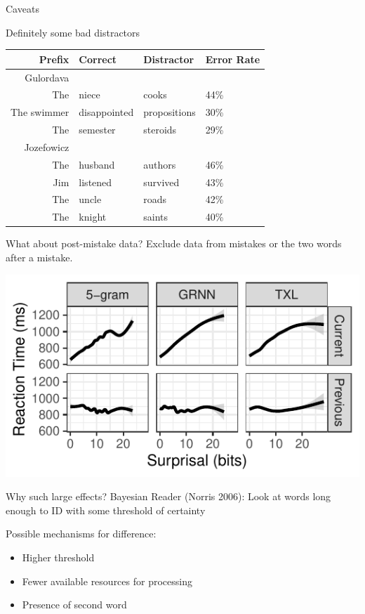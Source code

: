 \documentclass[12pt, xcolor=beamer,table,usenames,dvipsnames, ignorenonframetext, ngerman]{beamer}
\begin{document}
\begin{frame}{Caveats}
	
	{\large Definitely some bad distractors}
	\begin{table}
		
		
		\begin{tabular}{rlll}
			Prefix & Correct & Distractor & Error Rate \\
			\hline
			\hline
			Gulordava&&&\\
			\hline
			The & niece & cooks & 44\%\\
			The swimmer & disappointed & propositions & 30\%\\
			The & semester & steroids & 29\%\\
			\hline
			\hline
			Jozefowicz&&&\\
			\hline
			The & husband & authors & 46\%\\
			Jim & listened & survived & 43\%\\
			The & uncle & roads & 42\%\\
			The & knight & saints & 40\%\\
		\end{tabular}
	\end{table}
	
\end{frame}


\begin{frame}{What about post-mistake data?}
	Exclude data from mistakes or the two words after a mistake. 
	
	\includegraphics[width=.9\textwidth]{../Images/gam2.pdf}	
\end{frame}

\begin{frame}{Why such large effects?}
	\pause
	Bayesian Reader (Norris 2006): Look at words long enough to ID with some threshold of certainty \pause
	
	Possible mechanisms for difference: \pause
	\begin{itemize}
		\item Higher threshold \pause 
		\item Fewer available resources for processing \pause
		\item Presence of second word 
	\end{itemize}
	
\end{frame}
\end{document}
